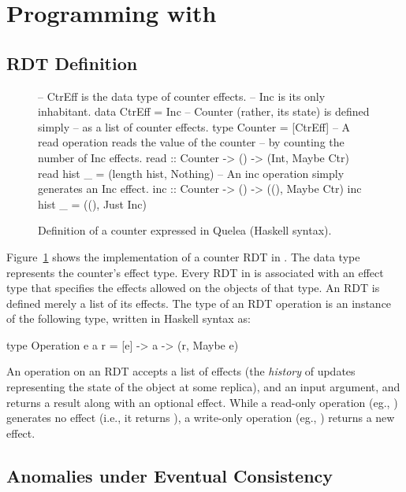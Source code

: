 \section{Programming with \name}
\label{sec:motivation}

\subsection{RDT Definition}

\begin{figure}
\small
\begin{codehaskell}
-- CtrEff is the data type of counter effects. 
-- Inc is its only inhabitant.
data CtrEff = Inc
-- Counter (rather, its state) is defined simply 
-- as a list of counter effects.
type Counter = [CtrEff]
-- A read operation reads the value of the counter
-- by counting the number of Inc effects.
read :: Counter -> () -> (Int, Maybe Ctr)
read hist _ = (length hist, Nothing)
-- An inc operation simply generates an Inc effect.
inc :: Counter -> () -> ((), Maybe Ctr)
inc hist _ = ((), Just Inc)
\end{codehaskell}
\caption{Definition of a counter expressed in Quelea (Haskell syntax).}
\label{fig:ex}
\end{figure}

Figure~\ref{fig:ex} shows the implementation of a counter RDT in
\name. The data type  represents the counter's effect type.
Every RDT in \name is associated with an effect type that specifies
the effects allowed on the objects of that type.  An RDT is defined
merely a list of its effects. The type of an RDT operation is an
instance of the following type, written in Haskell syntax as:

\begin{codehaskell}
type Operation e a r = [e] -> a -> (r, Maybe e)
\end{codehaskell}

\noindent An operation on an RDT accepts a list of effects (the
\emph{history} of updates representing the state of the object at some
replica), and an input argument, and returns a result along with an
optional effect.  While a read-only operation (eg., )
generates no effect (i.e., it returns ), a write-only
operation (eg., ) returns a new effect.

\subsection{Anomalies under Eventual Consistency}
\label{sec:anomalies}

